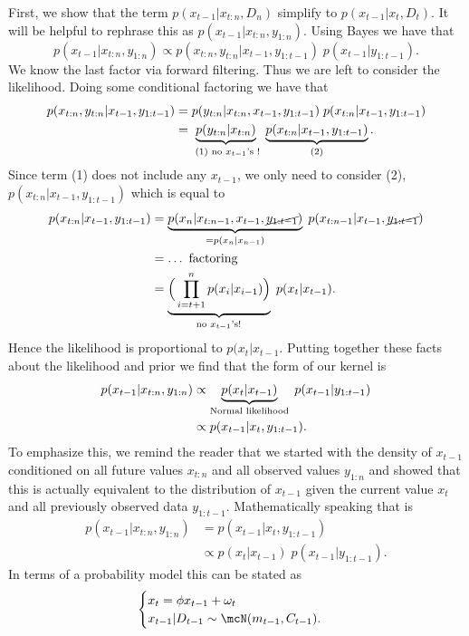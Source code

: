 \documentclass{article}
\begin{document}
First, we show that the term
\(
p(x_{t-1} | x_{t:n}, D_n)
\)
simplify to
\(
p(x_{t-1} | x_t, D_t).
\)
It will be helpful to rephrase this as $p(x_{t-1} | x_{t:n}, y_{1:n})$.  Using Bayes we have that
\[
p(x_{t-1} | x_{t:n}, y_{1:n}) \propto p(x_{t:n}, y_{t:n} | x_{t-1}, y_{1:t-1}) \; p(x_{t-1} | y_{1:t-1}).
\]
We know the last factor via forward filtering.  Thus we are left to consider the likelihood.  Doing some conditional factoring we have that
\begin{align*}
p(x_{t:n}, y_{t:n} | x_{t-1}, y_{1:t-1}) 
& =
p(y_{t:n} | x_{t:n}, x_{t-1}, y_{1:t-1}) \;
p(x_{t:n} | x_{t-1}, y_{1:t-1}) \\
& = 
\underbrace{ p(y_{t:n} | x_{t:n}) }_{\textmd{ (1) no $x_{t-1}$'s !}} \;
\underbrace{ p( x_{t:n} | x_{t-1}, y_{1:t-1} )}_{(2)}.
\end{align*}
Since term (1) does not include any $x_{t-1}$, we only need to consider (2),
\(
p(x_{t:n} | x_{t-1}, y_{1:t-1})
\)
which is equal to
\begin{align*}
p(x_{t:n} | x_{t-1}, y_{1:t-1})
& = \underbrace{ p(x_n | x_{t:n-1}, x_{t-1}, \cancel{y_{1:{t-1}}} ) }_{= p(x_n | x_{n-1}) } \;
p(x_{t:n-1} | x_{t-1}, \cancel{y_{1:t-1}} ) \\
& = \ldots \textmd{ factoring } \\
& = \underbrace{ \Big( \prod_{i=t+1}^n p(x_i | x_{i-1}) \Big) }_{\textmd{ no $x_{t-1}$'s! }} \; p(x_t | x_{t-1}).
\end{align*}
Hence the likelihood is proportional to $p(x_t | x_{t-1}$.  Putting together these facts about the likelihood and prior we find that the form of our kernel is
\begin{align*}
p(x_{t-1} | x_{t:n}, y_{1:n}) 
& \propto 
\underbrace{ p(x_{t} | x_{t-1}) }_{\textmd{Normal likelihood}} \;
p(x_{t-1} | y_{1:{t-1}}) \\
& \propto
p(x_{t-1} | x_t, y_{1:t-1} ).
\end{align*}
To emphasize this, we remind the reader that we started with the density of $x_{t-1}$ conditioned on all future values $x_{t:n}$ and all observed values $y_{1:n}$ and showed that this is actually equivalent to the distribution of $x_{t-1}$ given the current value $x_{t}$ and all previously observed data $y_{1:t-1}$.  Mathematically speaking that is
\begin{align*}
p(x_{t-1} | x_{t:n}, y_{1:n}) & = p(x_{t-1} | x_{t}, y_{1:t-1}) \\
& \propto p(x_t | x_{t-1}) \; p(x_{t-1} | y_{1:t-1} ).
\end{align*}
In terms of a probability model this can be stated as
\[
\begin{cases}
x_t = \phi x_{t-1} + \omega_t \\
x_{t-1} | D_{t-1} \sim \mcN(m_{t-1}, C_{t-1}).
\end{cases}
\]
\end{document}
